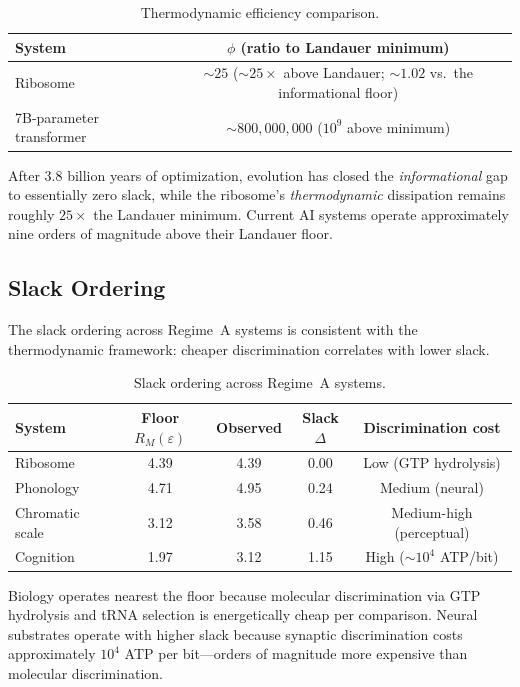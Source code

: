\documentclass[11pt]{article}
\begin{document}
\begin{table}[ht]
\centering
\caption{Thermodynamic efficiency comparison.}
\begin{tabular}{lc}
\toprule
System & $\phi$ (ratio to Landauer minimum) \\
\midrule
Ribosome & ${\sim}25$ (${\sim}25\times$ above Landauer; ${\sim}1.02$ vs.\ the informational floor) \\
7B-parameter transformer & ${\sim}800{,}000{,}000$ ($10^9$ above minimum) \\
\bottomrule
\end{tabular}
\label{tab:landauer}
\end{table}

After 3.8 billion years of optimization, evolution has closed the \emph{informational} gap to essentially zero slack, while the ribosome's \emph{thermodynamic} dissipation remains roughly $25\times$ the Landauer minimum. Current AI systems operate approximately nine orders of magnitude above their Landauer floor.

\subsection{Slack Ordering}

The slack ordering across Regime~A systems is consistent with the thermodynamic framework: cheaper discrimination correlates with lower slack.

\begin{table}[ht]
\centering
\caption{Slack ordering across Regime~A systems.}
\begin{tabular}{lcccc}
\toprule
System & Floor $R_M(\varepsilon)$ & Observed & Slack $\Delta$ & Discrimination cost \\
\midrule
Ribosome & 4.39 & 4.39 & 0.00 & Low (GTP hydrolysis) \\
Phonology & 4.71 & 4.95 & 0.24 & Medium (neural) \\
Chromatic scale & 3.12 & 3.58 & 0.46 & Medium-high (perceptual) \\
Cognition & 1.97 & 3.12 & 1.15 & High (${\sim}10^4$ ATP/bit) \\
\bottomrule
\end{tabular}
\label{tab:slack}
\end{table}

Biology operates nearest the floor because molecular discrimination via GTP hydrolysis and tRNA selection is energetically cheap per comparison. Neural substrates operate with higher slack because synaptic discrimination costs approximately $10^4$ ATP per bit---orders of magnitude more expensive than molecular discrimination.
\end{document}
